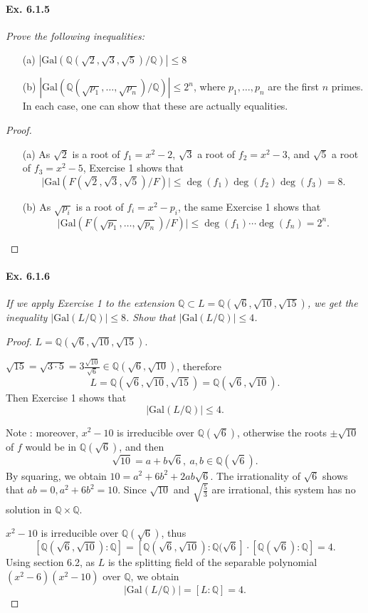 \documentclass[11pt,a4paper]{article}
\newcommand{\Q}{\mathbb{Q}}
\newcommand{\Gal}{\mathrm{Gal}}
\begin{document}
\paragraph{Ex. 6.1.5}

{\it Prove the following inequalities:
\begin{enumerate}
\item[(a)]  $ | \Gal(\Q(\sqrt{2},\sqrt{3},\sqrt{5})/\Q)| \leq 8$
\item[(b)]$ | \Gal(\Q(\sqrt{p_1},\ldots,\sqrt{p_n})/\Q)| \leq 2^n$, where $p_1,\ldots,p_n$ are the first $n$ primes.
In each case, one can show that these are actually equalities.
\end{enumerate}
}

\begin{proof}
\begin{enumerate}
\item[(a)]
As $\sqrt{2}$ is a root of $f_1=x^2-2$, $\sqrt{3}$ a root of $f_2=x^2-3$, and  $\sqrt{5}$ a root of $f_3=x^2-5$, Exercise 1 shows that
$$\vert \mathrm{Gal}(F(\sqrt{2},\sqrt{3},\sqrt{5})/F) \vert \leq \deg(f_1)\deg(f_2)\deg(f_3) = 8.$$


\item[(b)]
As $\sqrt{p_i}$ is a root of $f_i=x^2-p_i$, the same Exercise 1 shows that 
$$\vert \mathrm{Gal}(F(\sqrt{p_1},\ldots,\sqrt{p_n})/F) \vert \leq \deg(f_1)\cdots\deg(f_n) = 2^n.$$

\end{enumerate}
\end{proof}

\paragraph{Ex. 6.1.6}

{\it If we apply Exercise 1 to the extension $\Q \subset L = \Q(\sqrt{6},\sqrt{10},\sqrt{15})$, we get the inequality $|\Gal(L/\Q)| \leq 8$. Show that $|\Gal(L/\Q)| \leq 4$.
}

\begin{proof}
$L = \Q(\sqrt{6},\sqrt{10}, \sqrt{15})$.

$\sqrt{15} = \sqrt{3\cdot 5} = 3 \frac{\sqrt{10}}{\sqrt{6}} \in \Q(\sqrt{6},\sqrt{10})$, therefore
$$L = \Q(\sqrt{6},\sqrt{10}, \sqrt{15}) = \Q(\sqrt{6},\sqrt{10}).$$
Then Exercise 1 shows that $$|\Gal(L/\Q)| \leq 4.$$

Note : moreover, $x^2-10$ is irreducible over $\Q(\sqrt{6})$, otherwise the roots $\pm\sqrt{10}$ of $f$ would be in $\Q(\sqrt{6})$, and then
$$\sqrt{10} = a+b\sqrt{6}, \ a,b \in \Q(\sqrt{6}).$$
By squaring, we obtain $10  = a^2 + 6 b^2 + 2ab \sqrt{6}$. The irrationality of $\sqrt{6}$ shows that $ab=0, a^2+6b^2=10$. Since $\sqrt{10}$ and $\sqrt{\frac{5}{3}}$ are irrational, this system has no solution in $\Q \times \Q$.

$x^2-10$ is irreducible over $\Q(\sqrt{6})$, thus 
$$ [\Q(\sqrt{6},\sqrt{10}):\Q] = [\Q(\sqrt{6},\sqrt{10}):\Q(\sqrt{6}]\cdot[\Q(\sqrt{6}):\Q] = 4.$$
Using section 6.2, as $L$ is the splitting field of the separable polynomial {$(x^2-6)(x^2-10)$} over $\Q$, we obtain
$$|\Gal(L/\Q)| = [L : \Q] =  4.$$
\end{proof}
\end{document}
